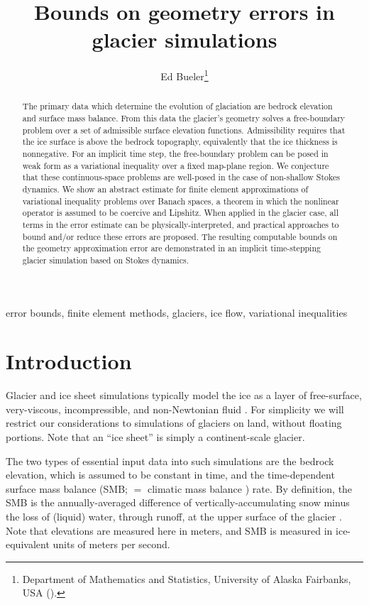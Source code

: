 \documentclass[hidelinks,onefignum,onetabnum,final]{siamart220329}  %
\title{Bounds on geometry errors in glacier simulations}
\author{Ed Bueler\thanks{Department of Mathematics and Statistics, University of Alaska Fairbanks, USA (\email{elbueler@alaska.edu}).}}
\begin{document}
\maketitle

\begin{abstract}
The primary data which determine the evolution of glaciation are bedrock elevation and surface mass balance.  From this data the glacier's geometry solves a free-boundary problem over a set of admissible surface elevation functions.  Admissibility requires that the ice surface is above the bedrock topography, equivalently that the ice thickness is nonnegative.  For an implicit time step, the free-boundary problem can be posed in weak form as a variational inequality over a fixed map-plane region.  We conjecture that these continuous-space problems are well-posed in the case of non-shallow Stokes dynamics.  We show an abstract estimate for finite element approximations of variational inequality problems over Banach spaces, a theorem in which the nonlinear operator is assumed to be coercive and Lipshitz.  When applied in the glacier case, all terms in the error estimate can be physically-interpreted, and practical approaches to bound and/or reduce these errors are proposed.  The resulting computable bounds on the geometry approximation error are demonstrated in an implicit time-stepping glacier simulation based on Stokes dynamics.
\end{abstract}

\begin{keywords}
error bounds, finite element methods, glaciers, ice flow, variational inequalities
\end{keywords}



\section{Introduction} \label{sec:intro}

Glacier and ice sheet simulations typically model the ice as a layer of free-surface, very-viscous, incompressible, and non-Newtonian fluid \cite{GreveBlatter2009,SchoofHewitt2013}.  For simplicity we will restrict our considerations to simulations of glaciers on land, without floating portions.  Note that an ``ice sheet'' is simply a continent-scale glacier.

The two types of essential input data into such simulations are the bedrock elevation, which is assumed to be constant in time, and the time-dependent surface mass balance (SMB; $=$ climatic mass balance \cite{Cogleyetal2011}) rate.  By definition, the SMB is the annually-averaged difference of vertically-accumulating snow minus the loss of (liquid) water, through runoff, at the upper surface of the glacier \cite{Cogleyetal2011}.  Note that elevations are measured here in meters, and SMB is measured in ice-equivalent units of meters per second.
\end{document}
